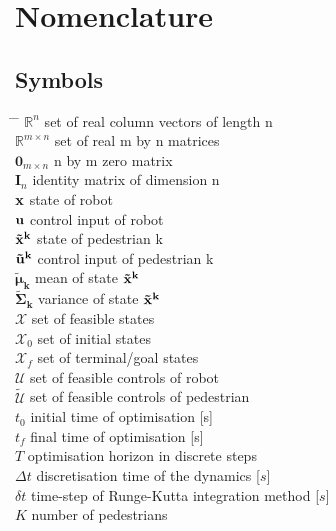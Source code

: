 \chapter*{Nomenclature}

\section*{Symbols}
\begin{tabbing}
\hspace*{1.6cm} \= \hspace*{8cm} \= \kill
$\mathbb{R}^n$ \> set of real column vectors of length n \\[0.5ex]
$\mathbb{R}^{m \times n}$ \> set of real m by n matrices \\[0.5ex]
$\mathbf{0}_{m \times n}$ \> n by m zero matrix \\[0.5ex]
$\mathbf{I}_n$ \> identity matrix of dimension n \\[0.5ex]
$\mathbf{x}$ \> state of robot \\[0.5ex]
$\mathbf{u}$ \> control input of robot \\[0.5ex]
$\xped[k]$ \> state of pedestrian k \\[0.5ex]
$\uped[k]$ \> control input of pedestrian k \\[0.5ex]
$\mathbf{\tilde{\mu}_k}$ \> mean of state $\xped[k]$ \\[0.5ex]
$\mathbf{\tilde{\Sigma}_k}$ \> variance of state $\xped[k]$ \\[0.5ex]
$\mathcal{X}$ \> set of feasible states \\[0.5ex]
$\mathcal{X}_0$ \> set of initial states \\[0.5ex]
$\mathcal{X}_f$ \> set of terminal/goal states \\[0.5ex]
$\mathcal{U}$ \> set of feasible controls of robot \\[0.5ex]
$\mathcal{\tilde{U}}$ \> set of feasible controls of pedestrian \\[0.5ex]
$t_0$ \> initial time of optimisation [s] \\[0.5ex]
$t_f$ \> final time of optimisation [s] \\[0.5ex]
$T$ \> optimisation horizon in discrete steps \\[0.5ex]
$\Delta t$ \> discretisation time of the dynamics [$s$] \\[0.5ex]
$\delta t$ \> time-step of Runge-Kutta integration method [$s$] \\[0.5ex]
$K$ \> number of pedestrians \\[0.5ex]

\end{tabbing}
